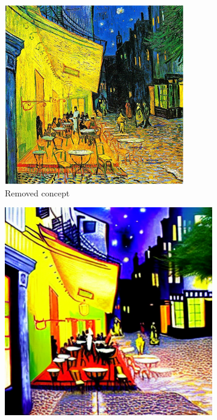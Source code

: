 
\begin{figure}[ht]
        \centering
        \begin{subfigure}[t]{0.32\linewidth}
            \centering
            \includegraphics[width=\linewidth]{figure_folder/reference.png}
            \vspace{-0.2in}
            \caption{\small Removed concept}
            \label{app:target_concept}
        \end{subfigure}
        \hfill
        \begin{subfigure}[t]{0.32\linewidth}
            \centering
            \includegraphics[width=\linewidth]{figure_folder/vangogh_baseline.png}

\end{subfigure}
\end{figure}
